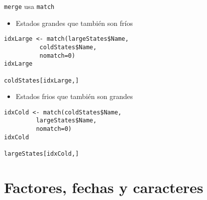 \documentclass[xcolor={usenames,svgnames,dvipsnames}]{beamer}
\begin{document}
\begin{frame}[fragile,label=sec-4-2-8]{\texttt{merge} usa \texttt{match}}
 \begin{itemize}
\item Estados grandes que también son fríos
\end{itemize}
\lstset{language=R,numbers=none}
\begin{lstlisting}
idxLarge <- match(largeStates$Name,
		  coldStates$Name,
		  nomatch=0)
idxLarge

coldStates[idxLarge,]
\end{lstlisting}

\begin{itemize}
\item Estados frios que también son grandes
\end{itemize}
\lstset{language=R,numbers=none}
\begin{lstlisting}
idxCold <- match(coldStates$Name,
		 largeStates$Name,
		 nomatch=0)
idxCold

largeStates[idxCold,]
\end{lstlisting}
\end{frame}
\section{Factores, fechas y caracteres}
\label{sec-5}
\end{document}
